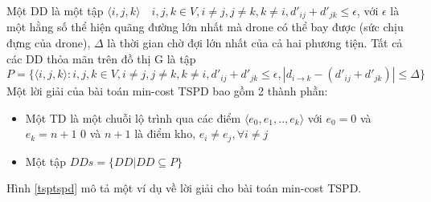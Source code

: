 \documentclass[a4paper,12pt]{report}
\begin{document}
Một \ac{DD} là một tập $\langle i,j,k\rangle \quad i,j,k \in V, i \neq j, j \neq k,k \neq i, d'_{ij}+d'_{jk} \leq \epsilon $, với $\epsilon $ là một hằng số thể hiện quãng đường lớn nhất mà drone có thể bay được (sức chịu đựng của drone), $\Delta$ là thời gian chờ đợi lớn nhất của cả hai phương tiện. Tất cả các \ac{DD} thỏa mãn trên đồ thị G là tập $$P=\{ \langle i,j,k \rangle : i,j,k \in V, i \neq j, j \neq k,k  \neq i, d'_{ij}+d'_{jk} \leq \epsilon,|d_{i\rightarrow k}-(d'_{ij}+d'_{jk})| \leq \Delta  \}$$
Một lời giải của bài toán min-cost TSPD bao gồm 2 thành phần:
\begin{itemize}
\item Một \ac{TD} là một chuỗi lộ trình qua các điểm $\langle e_0,e_1,..,e_k \rangle $ với $e_0=0$ và $e_k=n+1$ $0$ và $n+1$ là điểm kho, $e_i \neq e_j , \forall i \neq j$
\item Một tập $DDs=\{DD | DD \subseteq P \}$
\end{itemize} 
Hình \ref{tsptspd} mô tả một ví dụ về lời giải cho bài toán min-cost TSPD.
\end{document}
